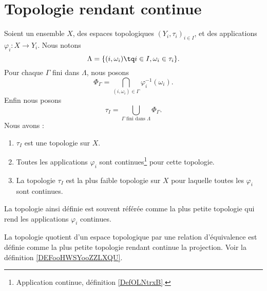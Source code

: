 \section{Topologie rendant continue}

\begin{proposition}     \label{PROPooGOEVooZBAOQh}
	Soient un ensemble \( X\), des espaces topologiques \( (Y_i,\tau_i)_{i\in I}\), et des applications \( \varphi_i\colon X\to Y_i\). Nous notons
	\begin{equation}
		\Lambda=\{ (i,\omega_i)\tq i\in I, \omega_i\in \tau_i \}.
	\end{equation}
	Pour chaque \( \Gamma\) fini dans \( \Lambda\), nous posons
	\begin{equation}
		\Phi_{\Gamma}=\bigcap_{(i,\omega_i)\in \Gamma}\varphi_i^{-1}(\omega_i).
	\end{equation}
	Enfin nous posons
	\begin{equation}
		\tau_I=\bigcup_{\Gamma\text{ fini dans } \Lambda}\Phi_{\Gamma}.
	\end{equation}
	Nous avons :
	\begin{enumerate}
		\item
		      \( \tau_I\) est une topologie sur \( X\).
		\item
            Toutes les applications \( \varphi_i\) sont continues\footnote{Application continue, définition \ref{DefOLNtrxB}.} pour cette topologie.
		\item
		      La topologie \( \tau_I\) est la plus faible topologie sur \( X\) pour laquelle toutes les \( \varphi_i\) sont continues.
	\end{enumerate}

    La topologie ainsi définie est souvent référée comme la plus petite topologie qui rend les applications \( \varphi_i\) continues.
\end{proposition}

La topologie quotient d'un espace topologique par une relation d'équivalence est définie comme la plus petite topologie rendant continue la projection. Voir la définition \ref{DEFooHWSYooZZLXQU}.

